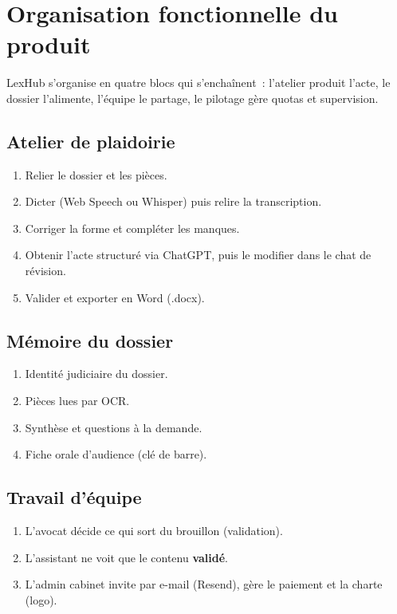 \section{Organisation fonctionnelle du produit}

LexHub s'organise en quatre blocs qui s'enchaînent~: l'atelier produit l'acte, le dossier l'alimente, l'équipe le partage, le pilotage gère quotas et supervision.

\subsection{Atelier de plaidoirie}
\begin{enumerate}[leftmargin=*,label=\arabic*.]
  \item Relier le dossier et les pièces.
  \item Dicter (Web Speech ou Whisper) puis relire la transcription.
  \item Corriger la forme et compléter les manques.
  \item Obtenir l'acte structuré via ChatGPT, puis le modifier dans le chat de révision.
  \item Valider et exporter en Word (.docx).
\end{enumerate}

\subsection{Mémoire du dossier}
\begin{enumerate}[leftmargin=*,label=\arabic*.]
  \item Identité judiciaire du dossier.
  \item Pièces lues par OCR.
  \item Synthèse et questions à la demande.
  \item Fiche orale d'audience (clé de barre).
\end{enumerate}

\subsection{Travail d'équipe}
\begin{enumerate}[leftmargin=*,label=\arabic*.]
  \item L'avocat décide ce qui sort du brouillon (validation).
  \item L'assistant ne voit que le contenu \textbf{validé}.
  \item L'admin cabinet invite par e-mail (Resend), gère le paiement et la charte (logo).
\end{enumerate}

